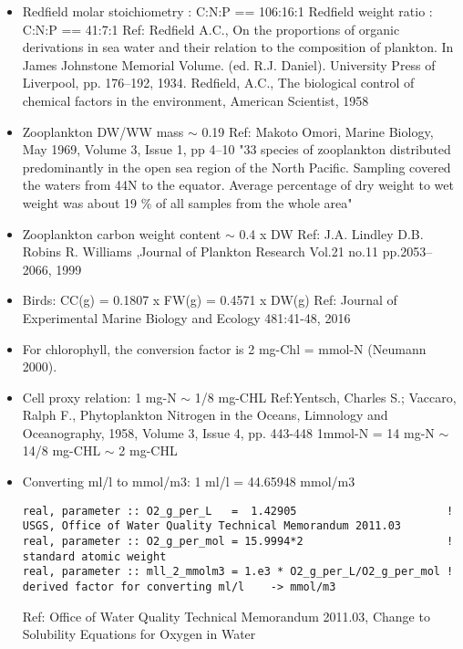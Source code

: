 

\begin{itemize}
   \item Redfield molar stoichiometry :   C:N:P == 106:16:1 \newline
         Redfield weight ratio        :   C:N:P == 41:7:1   \newline
         Ref: Redfield A.C., On the proportions of organic derivations in sea water and their relation to the composition of plankton.
         In James Johnstone Memorial Volume. (ed. R.J. Daniel). University Press of Liverpool, pp. 176–192, 1934.
         Redfield, A.C., The biological control of chemical factors in the environment, American Scientist, 1958
   \item Zooplankton DW/WW mass $\sim$ 0.19 \newline
         Ref: Makoto Omori, Marine Biology, May 1969, Volume 3, Issue 1, pp 4–10
         "33 species of zooplankton distributed predominantly in the open sea region of the North Pacific. 
         Sampling covered the waters from 44N to the equator. Average percentage of dry weight to wet weight was about 19 \% of all samples from the whole area"
   \item Zooplankton carbon weight content $\sim$ 0.4 x DW \newline
         Ref: J.A. Lindley D.B. Robins R. Williams ,Journal of Plankton Research Vol.21 no.11 pp.2053–2066,  1999
   \item Birds: CC(g) = 0.1807 x FW(g) = 0.4571 x DW(g)  \newline 
         Ref: Journal of Experimental Marine Biology and Ecology 481:41-48, 2016
   \item For chlorophyll, the conversion factor is 2 mg-Chl = mmol-N (Neumann 2000). 
   \item Cell proxy relation: 1 mg-N $\sim$ 1/8 mg-CHL\newline 
         Ref:Yentsch, Charles S.; Vaccaro, Ralph F., Phytoplankton Nitrogen in the Oceans, Limnology and Oceanography, 
         1958, Volume 3, Issue 4, pp. 443-448\newline 
         1mmol-N = 14 mg-N $\sim$ 14/8 mg-CHL $\sim$ 2 mg-CHL
   \item Converting ml/l to mmol/m3: 1 ml/l = 44.65948 mmol/m3\newline
         \begin{verbatim}
real, parameter :: O2_g_per_L   =  1.42905                       ! USGS, Office of Water Quality Technical Memorandum 2011.03
real, parameter :: O2_g_per_mol = 15.9994*2                      ! standard atomic weight
real, parameter :: mll_2_mmolm3 = 1.e3 * O2_g_per_L/O2_g_per_mol ! derived factor for converting ml/l    -> mmol/m3 
         \end{verbatim}
         Ref: Office of Water Quality Technical Memorandum 2011.03, Change to Solubility Equations for Oxygen in Water
\end{itemize}


